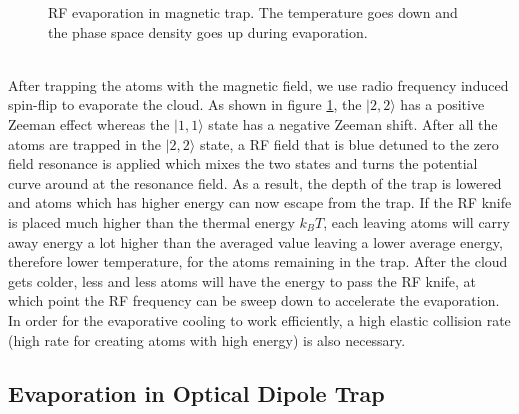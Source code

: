\begin{figure}
\begin{center}
{
    }
  \end{center}
  \caption{RF evaporation in magnetic trap. The temperature goes down and the phase space density goes up during evaporation.}
  \label{mt:evap}
\end{figure}\\
After trapping the atoms with the magnetic field, we use radio frequency induced spin-flip to evaporate the cloud. As shown in figure \ref{mt:evap}, the $|2, 2\rangle$ has a positive Zeeman effect whereas the $|1, 1\rangle$ state has a negative Zeeman shift. After all the atoms are trapped in the $|2, 2\rangle$ state, a RF field that is blue detuned to the zero field resonance is applied which mixes the two states and turns the potential curve around at the resonance field. As a result, the depth of the trap is lowered and atoms which has higher energy can now escape from the trap. If the RF knife is placed much higher than the thermal energy $k_BT$, each leaving atoms will carry away energy a lot higher than the averaged value leaving a lower average energy, therefore lower temperature, for the atoms remaining in the trap. After the cloud gets colder, less and less atoms will have the energy to pass the RF knife, at which point the RF frequency can be sweep down to accelerate the evaporation. In order for the evaporative cooling to work efficiently, a high elastic collision rate (high rate for creating atoms with high energy) is also necessary.

\subsection{Evaporation in Optical Dipole Trap}\label{theory:odt}

